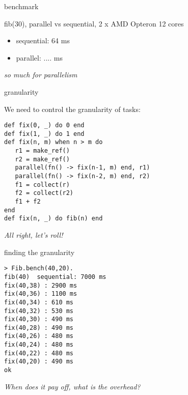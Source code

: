 \begin{frame}{benchmark}

fib(30),  parallel vs sequential, 2 x AMD Opteron 12 cores

\pause\vspace{20pt}

\begin{itemize}
\pause \item sequential: 64 ms 
\pause \item parallel: \pause ....  ms
\end{itemize}

\vspace{20pt}
{\em so much for parallelism}

\end{frame} 

\begin{frame}[fragile]{granularity}

We need to control the granularity of tasks:

 \begin{verbatim}
def fix(0, _) do 0 end
def fix(1, _) do 1 end
def fix(n, m) when n > m do 
   r1 = make_ref()
   r2 = make_ref()
   parallel(fn() -> fix(n-1, m) end, r1)
   parallel(fn() -> fix(n-2, m) end, r2)
   f1 = collect(r)
   f2 = collect(r2)
   f1 + f2
end
def fix(n, _) do fib(n) end
\end{verbatim}

\pause\vspace{20pt}
{\em All right, let's roll!}
\end{frame}

\begin{frame}[fragile]{finding the granularity}

\begin{verbatim}
> Fib.bench(40,20).
fib(40)  sequential: 7000 ms
fix(40,38) : 2900 ms
fix(40,36) : 1100 ms
fix(40,34) : 610 ms
fix(40,32) : 530 ms
fix(40,30) : 490 ms
fix(40,28) : 490 ms
fix(40,26) : 480 ms
fix(40,24) : 480 ms
fix(40,22) : 480 ms
fix(40,20) : 490 ms
ok
\end{verbatim}

{\em When does it pay off, what is the overhead?}

\end{frame}

